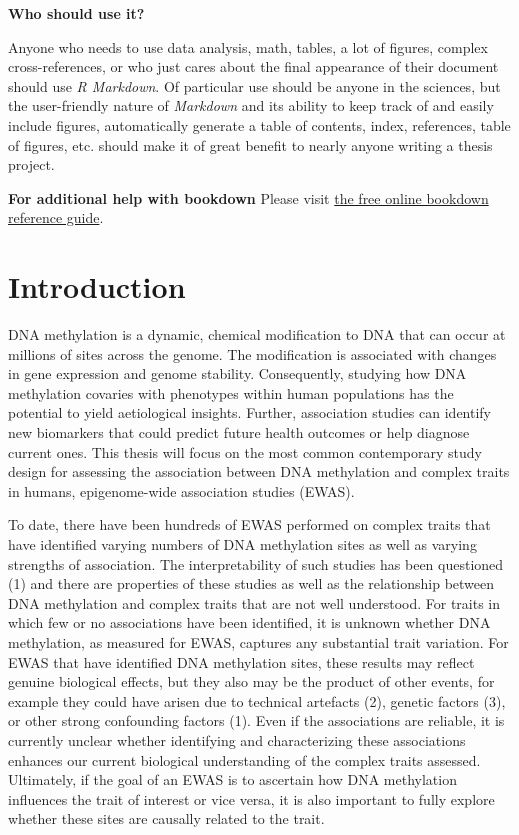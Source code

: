 \documentclass[11pt,oneside]{bristolthesis}
\begin{document}
\textbf{Who should use it?}

Anyone who needs to use data analysis, math, tables, a lot of figures, complex cross-references, or who just cares about the final appearance of their document should use \emph{R Markdown}. Of particular use should be anyone in the sciences, but the user-friendly nature of \emph{Markdown} and its ability to keep track of and easily include figures, automatically generate a table of contents, index, references, table of figures, etc. should make it of great benefit to nearly anyone writing a thesis project.

\textbf{For additional help with bookdown}
Please visit \href{https://bookdown.org/yihui/bookdown/}{the free online bookdown reference guide}.

\hypertarget{introduction}{%
\chapter{Introduction}\label{introduction}}

DNA methylation is a dynamic, chemical modification to DNA that can occur at millions of sites across the genome. The modification is associated with changes in gene expression and genome stability. Consequently, studying how DNA methylation covaries with phenotypes within human populations has the potential to yield aetiological insights. Further, association studies can identify new biomarkers that could predict future health outcomes or help diagnose current ones. This thesis will focus on the most common contemporary study design for assessing the association between DNA methylation and complex traits in humans, epigenome-wide association studies (EWAS).

To date, there have been hundreds of EWAS performed on complex traits that have identified varying numbers of DNA methylation sites as well as varying strengths of association. The interpretability of such studies has been questioned (1) and there are properties of these studies as well as the relationship between DNA methylation and complex traits that are not well understood. For traits in which few or no associations have been identified, it is unknown whether DNA methylation, as measured for EWAS, captures any substantial trait variation. For EWAS that have identified DNA methylation sites, these results may reflect genuine biological effects, but they also may be the product of other events, for example they could have arisen due to technical artefacts (2), genetic factors (3), or other strong confounding factors (1). Even if the associations are reliable, it is currently unclear whether identifying and characterizing these associations enhances our current biological understanding of the complex traits assessed. Ultimately, if the goal of an EWAS is to ascertain how DNA methylation influences the trait of interest or vice versa, it is also important to fully explore whether these sites are causally related to the trait.
\end{document}
